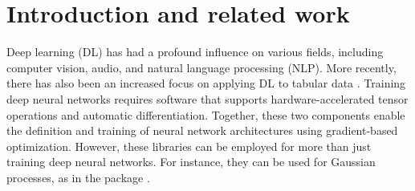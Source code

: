 \documentclass[article]{jss}
\theoremstyle{definition}
\begin{document}
\begin{comment}
Non-text TODOs:

\begin{itemize}
    \item [ ] I should provide all the documentation as part of the mlr3 book before submission
    \item [ ] ensure that caching is enabled in code because otherwise temp directory might be deleted for the melanoma dataset on linux
    \item [ ] Check that networks / learners that are not trained here still can be trained and are correctly constructed
    \item [ ] check that everything is working (like created callback) when it is not explicitly run in the code
    \item [ ] Should include JIT-improvements in torch and make a release, otherwise benchmark result is a little misleading
\end{itemize}

Text TODOs:

\begin{itemize}
    \item Appendix: What should be there? And if we add it there, reference it in the main text.
    \item Upkeep with mlr3torch: different output dim
\end{itemize}

\end{comment}

%
%
%
%
%

\section{Introduction and related work}

Deep learning (DL) has had a profound influence on various fields, including computer vision, audio, and natural language processing (NLP).
More recently, there has also been an increased focus on applying DL to tabular data \citep{ref-borisov2022deep}.
Training deep neural networks requires software that supports hardware-accelerated tensor operations and automatic differentiation.
Together, these two components enable the definition and training of neural network architectures using gradient-based optimization.
However, these libraries can be employed for more than just training deep neural networks. For instance, they can be used for Gaussian processes, as in the  package \citep{gardner2018gpytorch}.
\end{document}
